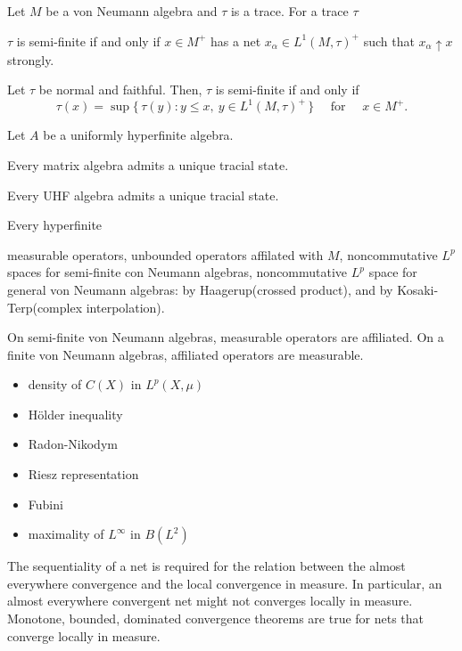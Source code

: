 \documentclass{../../large}
\begin{document}
\begin{prb}
Let $M$ be a von Neumann algebra and $\tau$ is a trace.
For a trace $\tau$
\begin{parts}
\item $\tau$ is semi-finite if and only if $x\in M^+$ has a net $x_\alpha\in L^1(M,\tau)^+$ such that $x_\alpha\uparrow x$ strongly.
\item Let $\tau$ be normal and faithful. Then, $\tau$ is semi-finite if and only if
\[\tau(x)=\sup\{\,\tau(y):y\le x,\ y\in L^1(M,\tau)^+\,\}\quad\text{ for }\quad x\in M^+.\]
\end{parts}
\end{prb}

\begin{prb}
Let $A$ be a uniformly hyperfinite algebra.
\begin{parts}
\item Every matrix algebra admits a unique tracial state.
\item Every UHF algebra admits a unique tracial state.
\item Every hyperfinite 
\end{parts}
\end{prb}


measurable operators,
unbounded operators affilated with $M$,
noncommutative $L^p$ spaces for semi-finite con Neumann algebras,
noncommutative $L^p$ space for general von Neumann algebras: by Haagerup(crossed product), and by Kosaki-Terp(complex interpolation).

On semi-finite von Neumann algebras, measurable operators are affiliated.
On a finite von Neumann algebras, affiliated operators are measurable.


\begin{itemize}
\item density of $C(X)$ in $L^p(X,\mu)$
\item H\"older inequality
\item Radon-Nikodym
\item Riesz representation
\item Fubini
\item maximality of $L^\infty$ in $B(L^2)$
\end{itemize}




The sequentiality of a net is required for the relation between the almost everywhere convergence and the local convergence in measure.
In particular, an almost everywhere convergent net might not converges locally in measure.
Monotone, bounded, dominated convergence theorems are true for nets that converge locally in measure.
\end{document}
